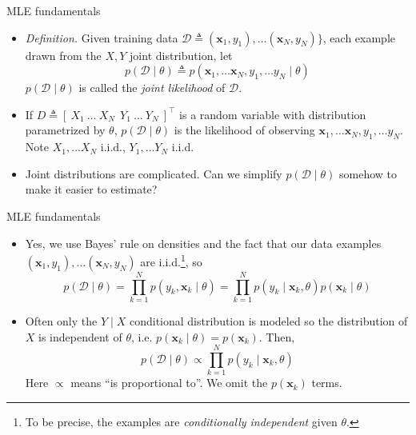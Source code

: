 \documentclass{beamer}
\numberwithin{equation}{section}
\begin{document}
\begin{frame}{MLE fundamentals}
    \begin{itemize}
        \item
        \textit{Definition.} Given training data $ \mathcal{D} \triangleq
        (\mathbf{x}_1, y_1), \ldots (\mathbf{x}_N, y_N)\} $, each example
        drawn from the $ X, Y $ joint distribution, let
        \begin{equation*}
            p(\mathcal{D} \mid \theta) \triangleq p(\mathbf{x}_1, \ldots
                \mathbf{x}_N, y_1, \ldots y_N \mid \theta)
        \end{equation*}
        $ p(\mathcal{D} \mid \theta) $ is called the
        \textit{joint likelihood} of $ \mathcal{D} $.

        \item
        If $ D \triangleq [ \ X_1 \ \ldots \ X_N \ \ Y_1 \ \ldots
        \ Y_N \ ]^\top $ is a random variable with distribution
        parametrized by $ \theta $, $ p(\mathcal{D} \mid \theta) $ is the
        likelihood of observing $ \mathbf{x}_1, \ldots \mathbf{x}_N, y_1,
        \ldots y_N $. Note $ X_1, \ldots X_N $ i.i.d.,
        $ Y_1, \ldots Y_N $ i.i.d.

        \item
        Joint distributions are complicated. Can we simplify
        $ p(\mathcal{D} \mid \theta) $ somehow to make it easier to estimate?
    \end{itemize}
\end{frame}

\begin{frame}{MLE fundamentals}
    \begin{itemize}
        \item
        Yes, we use Bayes' rule on densities and the fact that our data
        examples $ (\mathbf{x}_1, y_1), \ldots (\mathbf{x}_N, y_N) $ are
        i.i.d.\footnote{
            To be precise, the examples are \textit{conditionally independent}
            given $ \theta $.
        }, so
        \begin{equation*}
            p(\mathcal{D} \mid \theta) =
            \prod_{k = 1}^N p(y_k, \mathbf{x}_k \mid \theta) =
            \prod_{k = 1}^N p(y_k \mid \mathbf{x}_k, \theta)
                p(\mathbf{x}_k \mid \theta)
        \end{equation*}

        \item
        Often only the $ Y \mid X $ conditional distribution is modeled so the
        distribution of $ X $ is independent of $ \theta $, i.e.
        $ p(\mathbf{x}_k \mid \theta) = p(\mathbf{x}_k) $. Then,
        \begin{equation} \label{cond_likelihood}
            p(\mathcal{D} \mid \theta) \propto
            \prod_{k = 1}^N p(y_k \mid \mathbf{x}_k, \theta)
        \end{equation}
        Here $ \propto $ means ``is proportional to''. We omit the
        $ p(\mathbf{x}_k) $ terms.
    \end{itemize}
\end{frame}
\end{document}
